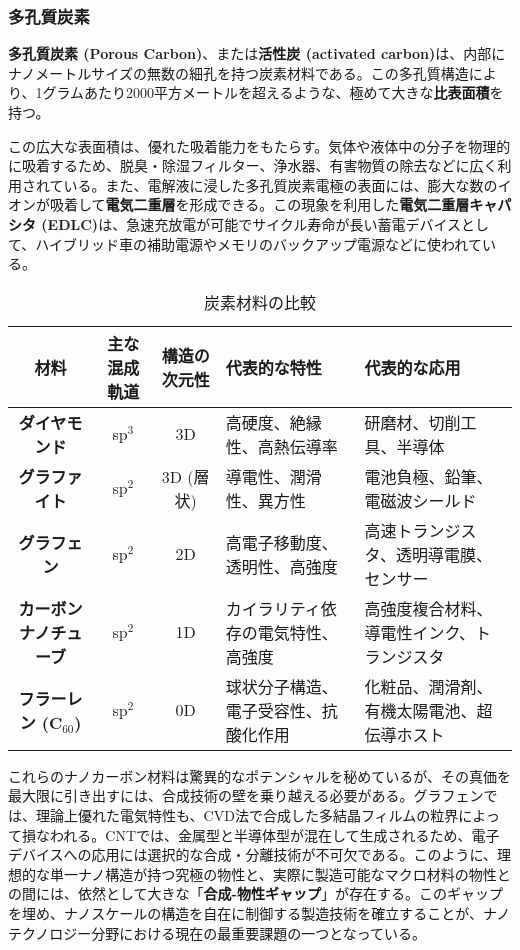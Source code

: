 \documentclass[11pt,a4paper]{ltjsarticle}
\begin{document}
\subsubsection*{多孔質炭素}

\textbf{多孔質炭素 (Porous Carbon)}、または\textbf{活性炭 (activated carbon)}は、内部にナノメートルサイズの無数の細孔を持つ炭素材料である。この多孔質構造により、1グラムあたり2000平方メートルを超えるような、極めて大きな\textbf{比表面積}を持つ。

この広大な表面積は、優れた吸着能力をもたらす。気体や液体中の分子を物理的に吸着するため、脱臭・除湿フィルター、浄水器、有害物質の除去などに広く利用されている。また、電解液に浸した多孔質炭素電極の表面には、膨大な数のイオンが吸着して\textbf{電気二重層}を形成できる。この現象を利用した\textbf{電気二重層キャパシタ (EDLC)}は、急速充放電が可能でサイクル寿命が長い蓄電デバイスとして、ハイブリッド車の補助電源やメモリのバックアップ電源などに使われている。

\begin{table*}[ht]
\centering
\caption{炭素材料の比較}
\begin{tabularx}{\textwidth}{|c|c|c|X|X|}
\hline
\textbf{材料} & \textbf{主な混成軌道} & \textbf{構造の次元性} & \textbf{代表的な特性} & \textbf{代表的な応用} \\
\hline
\textbf{ダイヤモンド} & sp$^3$ & 3D & 高硬度、絶縁性、高熱伝導率 & 研磨材、切削工具、半導体 \\
\hline
\textbf{グラファイト} & sp$^2$ & 3D (層状) & 導電性、潤滑性、異方性 & 電池負極、鉛筆、電磁波シールド \\
\hline
\textbf{グラフェン} & sp$^2$ & 2D & 高電子移動度、透明性、高強度 & 高速トランジスタ、透明導電膜、センサー \\
\hline
\textbf{カーボンナノチューブ} & sp$^2$ & 1D & カイラリティ依存の電気特性、高強度 & 高強度複合材料、導電性インク、トランジスタ \\
\hline
\textbf{フラーレン (C$_{60}$)} & sp$^2$ & 0D & 球状分子構造、電子受容性、抗酸化作用 & 化粧品、潤滑剤、有機太陽電池、超伝導ホスト \\
\hline
\end{tabularx}
\end{table*}

これらのナノカーボン材料は驚異的なポテンシャルを秘めているが、その真価を最大限に引き出すには、合成技術の壁を乗り越える必要がある。グラフェンでは、理論上優れた電気特性も、CVD法で合成した多結晶フィルムの粒界によって損なわれる。CNTでは、金属型と半導体型が混在して生成されるため、電子デバイスへの応用には選択的な合成・分離技術が不可欠である。このように、理想的な単一ナノ構造が持つ究極の物性と、実際に製造可能なマクロ材料の物性との間には、依然として大きな「\textbf{合成-物性ギャップ}」が存在する。このギャップを埋め、ナノスケールの構造を自在に制御する製造技術を確立することが、ナノテクノロジー分野における現在の最重要課題の一つとなっている。
\end{document}
